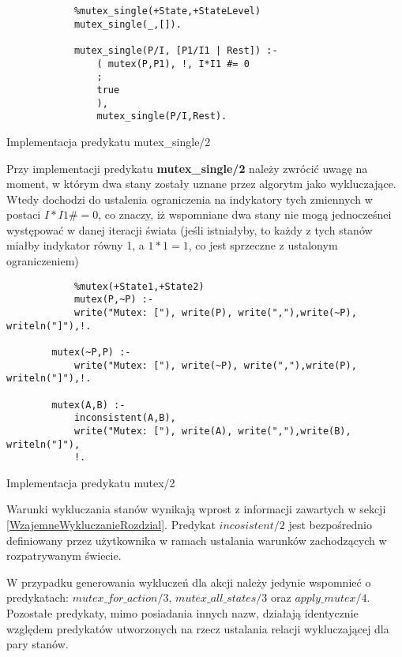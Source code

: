     \begin{listing}[H]
        \begin{verbatim}
            %mutex_single(+State,+StateLevel)
            mutex_single(_,[]).

            mutex_single(P/I, [P1/I1 | Rest]) :-
                ( mutex(P,P1), !, I*I1 #= 0
                ;
                true
                ),
                mutex_single(P/I,Rest).
    \end{verbatim}
    \caption{Implementacja predykatu mutex\_single/2}
    \end{listing}

    Przy implementacji predykatu \textbf{mutex\_single/2} należy zwrócić uwagę na moment, w którym dwa stany zostały uznane przez algorytm jako
    wykluczające. Wtedy dochodzi do ustalenia ograniczenia na indykatory tych zmiennych w postaci $I*I1 \#= 0$, co znaczy, iż wspomniane dwa 
    stany nie mogą jednocześnei występować w danej iteracji świata (jeśli istniałyby, to każdy z tych stanów miałby indykator równy 1, a $1*1=1$, 
    co jest sprzeczne z ustalonym ograniczeniem)

    \begin{listing}[H]
        \begin{verbatim}
            %mutex(+State1,+State2)
            mutex(P,~P) :-
            write("Mutex: ["), write(P), write(","),write(~P), writeln("]"),!.
        
        mutex(~P,P) :-
            write("Mutex: ["), write(~P), write(","),write(P), writeln("]"),!.  
        
        mutex(A,B) :-              
            inconsistent(A,B),
            write("Mutex: ["), write(A), write(","),write(B), writeln("]"), 
            !.
    \end{verbatim}
    \caption{Implementacja predykatu mutex/2}
    \end{listing}

    Warunki wykluczania stanów wynikają wprost z informacji zawartych w sekcji \ref{WzajemneWykluczanieRozdzial}. Predykat $incosistent/2$ jest bezpośrednio definiowany przez 
    użytkownika w ramach ustalania warunków zachodzących w rozpatrywanym świecie.

    W przypadku generowania wykluczeń dla akcji należy jedynie wspomnieć o predykatach: $mutex\_for\_action/3$, $mutex\_all\_states/3$ oraz $apply\_mutex/4$.
    Pozostałe predykaty, mimo posiadania innych nazw, działają identycznie względem predykatów utworzonych na rzecz ustalania relacji wykluczającej dla 
    pary stanów.

